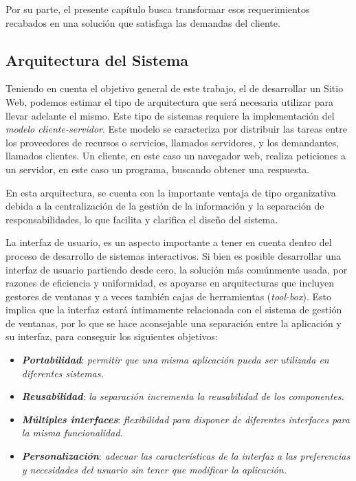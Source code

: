 \documentclass[11pt,oneside]{book}
\begin{document}
Por su parte, el presente capítulo busca transformar esos requerimientos recabados en una solución que satisfaga las demandas del cliente.

\subsection{Arquitectura del Sistema}
Teniendo en cuenta el objetivo general de este trabajo, el de desarrollar un Sitio Web, podemos estimar el tipo de arquitectura que será necesaria utilizar para llevar adelante el mismo. Este tipo de sistemas requiere la implementación del \textit{modelo cliente-servidor}. Este modelo se caracteriza por distribuir las tareas entre los proveedores de recursos o servicios, llamados servidores, y los demandantes, llamados clientes. Un cliente, en este caso un navegador web, realiza peticiones a un servidor, en este caso un programa, buscando obtener una respuesta.

En esta arquitectura, se cuenta con la importante ventaja de tipo organizativa debida a la centralización de la gestión de la información y la separación de responsabilidades, lo que facilita y clarifica el diseño del sistema.

La interfaz de usuario, es un aspecto importante a tener en cuenta dentro del proceso de desarrollo de sistemas interactivos. Si bien es posible desarrollar una interfaz de usuario partiendo desde cero, la solución más comúnmente usada, por razones de eficiencia y uniformidad, es apoyarse en arquitecturas que incluyen gestores de ventanas y a veces también cajas de herramientas (\textit{tool-box}). Esto implica que la interfaz estará íntimamente relacionada con el sistema de gestión de ventanas, por lo que se hace aconsejable una separación entre la aplicación y su interfaz, para conseguir los siguientes objetivos:
\begin{itemize}
\item \textit{\textbf{Portabilidad}}: \textit{permitir que una misma aplicación pueda ser utilizada en diferentes sistemas.}
\item \textit{\textbf{Reusabilidad}}: \textit{la separación incrementa la reusabilidad de los componentes.}
\item \textit{\textbf{Múltiples interfaces}}: \textit{flexibilidad para disponer de diferentes interfaces para la misma funcionalidad.}
\item \textit{\textbf{Personalización}}: \textit{adecuar las características de la interfaz a las preferencias y necesidades del usuario sin tener que modificar la aplicación.}
\end{itemize}
\end{document}
